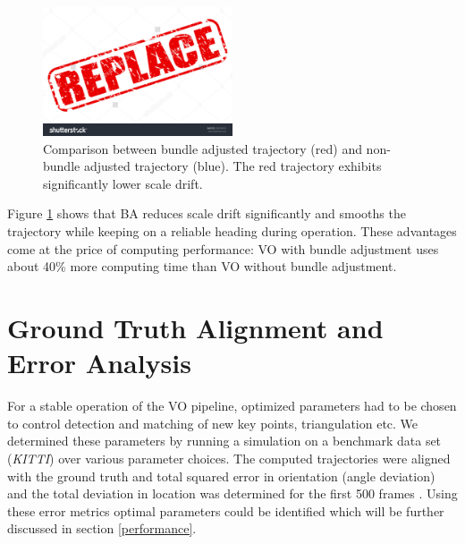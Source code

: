 \begin{figure}[htp]
  \centering
    \includegraphics[width=0.5\textwidth]{figures/BAeffect}
  \caption{Comparison between bundle adjusted trajectory (red) and non-bundle adjusted trajectory (blue). The red trajectory exhibits significantly lower scale drift.}
  \label{fig:BAeffect}
\end{figure}

Figure \ref{fig:BAeffect} shows that BA reduces scale drift significantly and smooths the trajectory while keeping on a reliable heading during operation. These advantages come at the price of computing performance: VO with bundle adjustment uses about 40\% more computing time than VO without bundle adjustment.

\section{Ground Truth Alignment and Error Analysis}
\label{simulation}

For a stable operation of the VO pipeline, optimized parameters had to be chosen to control detection and matching of new key points, triangulation etc. 
We determined these parameters by running a simulation  on a benchmark data set (\emph{KITTI}) over various parameter choices. The computed trajectories were aligned with the ground truth and total squared error in orientation (angle deviation) and the total deviation in location was determined for the first 500 frames . Using these error metrics optimal parameters could be identified which will be further discussed in section \ref{performance}.